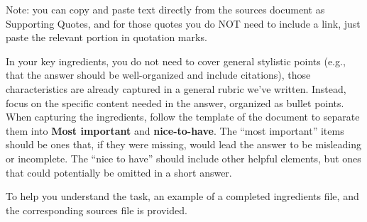 \documentclass{article} %
\begin{document}
\begin{table}[h!]
\begin{tcolorbox}
\begin{enumerate}
    Note: you can copy and paste text directly from the sources document as Supporting Quotes, and for those quotes you do NOT need to include a link, just paste the relevant portion in quotation marks.
\end{enumerate}


In your key ingredients, you do not need to cover general stylistic points (e.g., that the answer should be well-organized and include citations), those characteristics are already captured in a general rubric we’ve written.  Instead, focus on the specific content needed in the answer, organized as bullet points.  When capturing the ingredients, follow the template of the document to separate them into \textbf{Most important} and \textbf{nice-to-have}.  The ``most important'' items should be ones that, if they were missing, would lead the answer to be misleading or incomplete.  The ``nice to have'' should include other helpful elements, but ones that could potentially be omitted in a short answer.

To help you understand the task, an example of a completed ingredients file, and the corresponding sources file is provided.

\end{tcolorbox}
\caption{\label{tab:annotator instructions_cs} {\bf \textsc{ScholarQA-CS} annotation instructions}: Instructions given to our expert annotators for producing key ingredients for \textsc{ScholarQA-CS} questions.}
\end{table}
\end{document}
